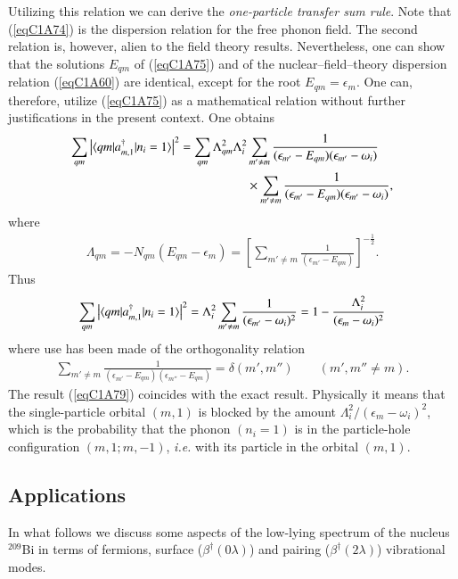 Utilizing this relation we can derive the\textit{ one-particle transfer sum rule}. Note that (\ref{eqC1A74}) is the dispersion relation for the free phonon field. The second relation is, however, alien to the field theory results. Nevertheless, one can show that the solutions $E_{qm}$ of (\ref{eqC1A75}) and of the nuclear--field--theory dispersion relation (\ref{eqC1A60}) are identical, except for the root $E_{qm}=\epsilon_m$. One can, therefore, utilize (\ref{eqC1A75}) as a mathematical relation without further justifications in the 
present context. One obtains 
  \begin{align}\label{eqC1A77} 
   \nonumber \sum_{qm}\left|\langle {qm|a^\dagger_{m,1}|n_i=1} \rangle\right|^2=\sum_{qm}\Lambda_{qm}^2\Lambda_i^2& \sum_{m'\neq m}\frac{1}{(\epsilon_{m'}-E_{qm})(\epsilon_{m'}-\omega_i)}\\
   &\times \sum_{m'\neq m}\frac{1}{(\epsilon_{m'}-E_{qm})(\epsilon_{m'}-\omega_i)},
    \end{align} 
where
  \begin{align}\label{eqC1A78} 
   \Lambda_{qm}=-N_{qm}(E_{qm}-\epsilon_m)=\left[\sum_{m'\neq m}\frac{1}{(\epsilon_{m'}-E_{qm})}\right]^{-\frac{1}{2}}.
    \end{align} 
    Thus
      \begin{align}\label{eqC1A79} 
 \sum_{qm}\left|\langle {qm|a^\dagger_{m,1}|n_i=1} \rangle\right|^2=\Lambda_i^2\sum_{m'\neq m}\frac{1}{(\epsilon_{m'}-\omega_i)^2}=1-\frac{\Lambda^2_i}{(\epsilon_m-\omega_i)^2}     
        \end{align} 
where use has been made of the orthogonality relation 
  \begin{align}\label{eqC1A80} 
\sum_{m'\neq m}\frac{1}{(\epsilon_{m'}-E_{qm})(\epsilon_{m''}-E_{qm})}=\delta(m',m'')\qquad (m',m''\neq m).
    \end{align}  
The result (\ref{eqC1A79}) coincides with the exact result. Physically it means that the single-particle orbital $(m, 1)$ is blocked by the amount $\Lambda_i^2/(\epsilon_m-\omega_i)^2$, which is the probability that the phonon $(n_i= 1)$ is in the particle-hole configuration $(m,1;m,-1)$, \textit{i.e.} with its particle in the orbital $(m,1)$. 
\subsection{Applications}\label{Sect1.7.4}
In what follows we discuss some aspects of the low-lying spectrum of the nucleus $^{209}$Bi in terms of fermions, surface ($\beta^\dagger(0\lambda)$) and pairing ($\beta^\dagger(2\lambda)$) vibrational modes. 

